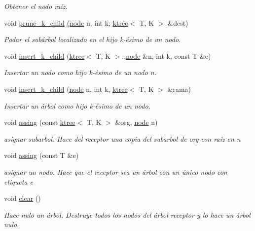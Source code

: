 \begin{DoxyCompactItemize}
\begin{DoxyCompactList}\small\item\em Obtener el nodo raíz. \end{DoxyCompactList}\item 
void \hyperlink{classktree_ae10914de8d5fc7d594bc0f4364e255c1}{prune\+\_\+k\+\_\+child} (\hyperlink{classktree_1_1node}{node} n, int k, \hyperlink{classktree}{ktree}$<$ T, K $>$ \&dest)
\begin{DoxyCompactList}\small\item\em Podar el subárbol localizado en el hijo k-\/ésimo de un nodo. \end{DoxyCompactList}\item 
void \hyperlink{classktree_a10b652a0d5ad225d550726b5bed22a5c}{insert\+\_\+k\+\_\+child} (\hyperlink{classktree}{ktree}$<$ T, K $>$\+::\hyperlink{classktree_1_1node}{node} \&n, int k, const T \&e)
\begin{DoxyCompactList}\small\item\em Insertar un nodo como hijo k-\/ésimo de un nodo n. \end{DoxyCompactList}\item 
void \hyperlink{classktree_a33d22bb9a3960d93de58a6d84956bd13}{insert\+\_\+k\+\_\+child} (\hyperlink{classktree_1_1node}{node} n, int k, \hyperlink{classktree}{ktree}$<$ T, K $>$ \&rama)
\begin{DoxyCompactList}\small\item\em Insertar un árbol como hijo k-\/ésimo de un nodo. \end{DoxyCompactList}\item 
void \hyperlink{classktree_a2fbab28302612402eae9097b6d520300}{assing} (const \hyperlink{classktree}{ktree}$<$ T, K $>$ \&org, \hyperlink{classktree_1_1node}{node} n)
\begin{DoxyCompactList}\small\item\em asignar subarbol. Hace del receptor una copia del subarbol de org con raíz en n \end{DoxyCompactList}\item 
void \hyperlink{classktree_aeaf32bc182e353b0d29f9630a792c8a4}{assing} (const T \&e)
\begin{DoxyCompactList}\small\item\em asignar un nodo. Hace que el receptor sea un árbol con un único nodo con etiqueta e \end{DoxyCompactList}\item 
void \hyperlink{classktree_a02ef64af59f862c9988831879969a599}{clear} ()
\begin{DoxyCompactList}\small\item\em Hace nulo un árbol. Destruye todos los nodos del árbol receptor y lo hace un árbol nulo. \end{DoxyCompactList}\item 

\end{DoxyCompactItemize}
